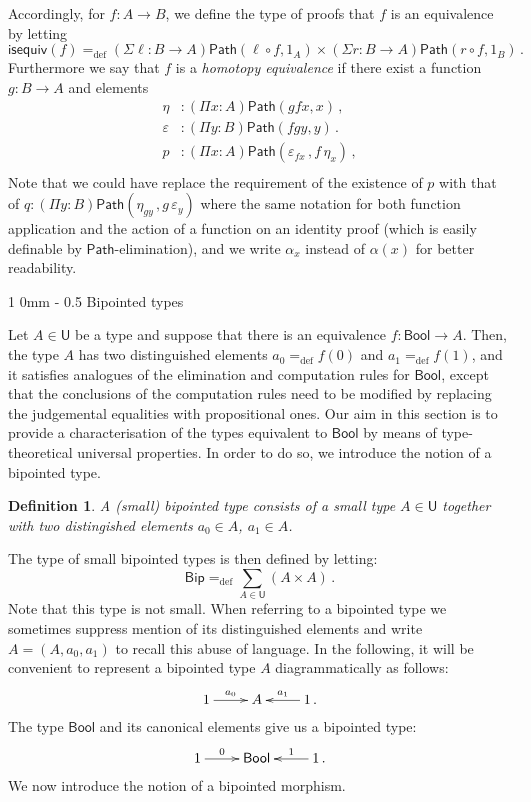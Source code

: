 \documentclass[10pt,a4paper,oneside,reqno]{amsart}
\makeatletter
\numberwithin{equation}{section}
\renewcommand{\section}{\@startsection
  {section}%
   {1}%
  {0mm}%
   {-\baselineskip}%
  {0.5\baselineskip}%
   {\Large\bfseries}}%
\theoremstyle{mythm}
\theoremstyle{mydef}
\newtheorem{definition}[theorem]{Definition}
\theoremstyle{myrmk}
\newcommand{\defeq}{=_{\mathrm{def}}}
\newcommand{\co}{\colon}
\newcommand{\isequiv}{\mathsf{isequiv}}
\newcommand{\Id}{\mathsf{Path}}
\newcommand{\Bool}{\mathsf{Bool}}
\newcommand{\UU}{\mathsf{U}}
\newcommand{\Bip}{\mathsf{Bip}}
\makeatother
\begin{document}
 Accordingly, for $f : A \rightarrow B$, we define the type of proofs that $f$ is an equivalence by letting
 \[ 
 \isequiv(f) \defeq (\Sigma \ell \co B \to A) \Id( \ell \circ f, 1_A) \times (\Sigma r \co B \to A) \Id( r \circ f , 1_B) \, .
 \]
Furthermore we say that $f$ is a \emph{homotopy equivalence} if there exist a function 
$g : B\rightarrow A$ and elements
\begin{align*}
\eta &: (\Pi x : A) \Id( g  f  x , x) \,  ,\\
\varepsilon &: (\Pi y:B) \Id( f   g  y, y) \, . \\
p & : (\Pi x : A) \Id ( \varepsilon_{f x} \, , f \, \eta_x )  \, , \\
\end{align*}
Note that we could have replace the requirement of the existence of $p$ with that of $q \co (\Pi y : B) \Id ( \eta_{g y} \, , g \, \varepsilon_y)$
where the same notation for both function application and
the action of a function on an identity proof (which is easily definable by $\Id$-elimination),
and we write $\alpha_x$ instead of $\alpha(x)$ for better readability.


\newpage

\section{Bipointed types}
\label{sec:bip}



Let $A \in \UU$ be a type and suppose that there is an equivalence $f \co \Bool \to A$. Then, the type $A$ 
has two distinguished elements $a_0 \defeq f(0)$ and $a_1 \defeq f(1)$, and it satisfies
analogues of the elimination and computation rules for $\Bool$, except that the conclusions of the computation 
rules need to be modified  by replacing the judgemental equalities  with propositional ones. Our aim in this section is to provide a characterisation of the types equivalent to $\Bool$ by means of type-theoretical universal properties. In order to do so, we introduce the notion of a bipointed type. 


\begin{definition} \label{thm:bipointedtype}
A  (small) \emph{bipointed type} consists of a small type $A \in \UU$ together with two distingished elements 
$a_0 \in A$, $a_1 \in A$.
\end{definition}

The type of small bipointed types is then defined by letting:
\[
\Bip \defeq \sum_ {A \in \UU}( A \times A ) \, .
\]
Note that this type is not small.
When referring to a bipointed type we sometimes suppress mention of its distinguished elements and write $A = (A, a_0, a_1)$ to
recall this abuse of language.  In the following, it will be convenient to represent a bipointed type $A$ diagrammatically as follows:
\[
\xymatrix{
 1 \ar[r]^-{a_0}&  A & 1 \ar[l]_-{a_1} \, .}
 \]
The type $\Bool$ and its canonical elements give us a bipointed type:
\[
\xymatrix{
 1 \ar[r]^-{0}&  \Bool  & 1 \ar[l]_-{1} \, . }
 \]
We now introduce the notion of a bipointed morphism.
\end{document}
